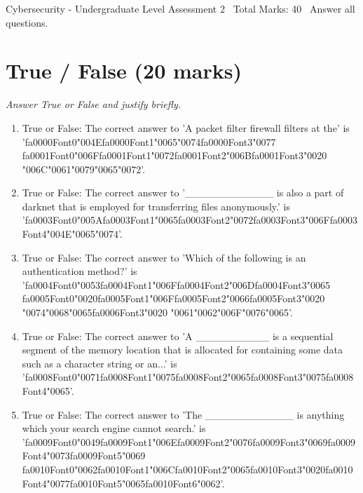 \documentclass[12pt]{article}
\begin{document}
\begin{center}
Cybersecurity - Undergraduate Level Assessment 2 \
Total Marks: 40 \
Answer all questions.
\end{center}

\section*{True / False (20 marks)}
\textit{Answer True or False and justify briefly.}
\begin{enumerate}[label=\arabic*.]
\item True or False: The correct answer to 'A packet filter firewall filters at the' is '{\csname fa0000Font0\endcsname\char"004E}{\csname fa0000Font1\endcsname\char"0065}{\char"0074}{\csname fa0000Font3\endcsname\char"0077} {\csname fa0001Font0\endcsname\char"006F}{\csname fa0001Font1\endcsname\char"0072}{\csname fa0001Font2\endcsname\char"006B}{\csname fa0001Font3\endcsname\char"0020} {\char"006C}{\char"0061}{\char"0079}{\char"0065}{\char"0072}'.
\item True or False: The correct answer to '\_\_\_\_\_\_\_\_\_\_\_\_ is also a part of darknet that is employed for transferring files anonymously.' is '{\csname fa0003Font0\endcsname\char"005A}{\csname fa0003Font1\endcsname\char"0065}{\csname fa0003Font2\endcsname\char"0072}{\csname fa0003Font3\endcsname\char"006F}{\csname fa0003Font4\endcsname\char"004E}{\char"0065}{\char"0074}'.
\item True or False: The correct answer to 'Which of the following is an authentication method?' is '{\csname fa0004Font0\endcsname\char"0053}{\csname fa0004Font1\endcsname\char"006F}{\csname fa0004Font2\endcsname\char"006D}{\csname fa0004Font3\endcsname\char"0065} {\csname fa0005Font0\endcsname\char"0020}{\csname fa0005Font1\endcsname\char"006F}{\csname fa0005Font2\endcsname\char"0066}{\csname fa0005Font3\endcsname\char"0020} {\char"0074}{\char"0068}{\char"0065}{\csname fa0006Font3\endcsname\char"0020} {\char"0061}{\char"0062}{\char"006F}{\char"0076}{\char"0065}'.
\item True or False: The correct answer to 'A \_\_\_\_\_\_\_\_\_\_ is a sequential segment of the memory location that is allocated for containing some data such as a character string or an...' is '{\csname fa0008Font0\endcsname\char"0071}{\csname fa0008Font1\endcsname\char"0075}{\csname fa0008Font2\endcsname\char"0065}{\csname fa0008Font3\endcsname\char"0075}{\csname fa0008Font4\endcsname\char"0065}'.
\item True or False: The correct answer to 'The \_\_\_\_\_\_\_\_\_\_\_\_ is anything which your search engine cannot search.' is '{\csname fa0009Font0\endcsname\char"0049}{\csname fa0009Font1\endcsname\char"006E}{\csname fa0009Font2\endcsname\char"0076}{\csname fa0009Font3\endcsname\char"0069}{\csname fa0009Font4\endcsname\char"0073}{\csname fa0009Font5\endcsname\char"0069} {\csname fa0010Font0\endcsname\char"0062}{\csname fa0010Font1\endcsname\char"006C}{\csname fa0010Font2\endcsname\char"0065}{\csname fa0010Font3\endcsname\char"0020}{\csname fa0010Font4\endcsname\char"0077}{\csname fa0010Font5\endcsname\char"0065}{\csname fa0010Font6\endcsname\char"0062}'.

\end{enumerate}
\end{document}
